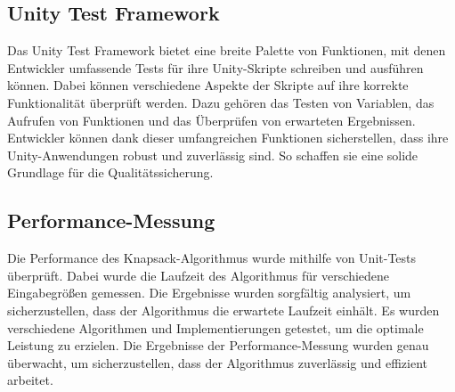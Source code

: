 \subsection{Unity Test Framework}
Das Unity Test Framework bietet eine breite Palette von Funktionen, mit denen Entwickler umfassende Tests für ihre
Unity-Skripte schreiben und ausführen können. Dabei können verschiedene Aspekte der Skripte auf ihre korrekte Funktionalität
überprüft werden. Dazu gehören das Testen von Variablen, das Aufrufen von Funktionen und das Überprüfen von erwarteten
Ergebnissen. Entwickler können dank dieser umfangreichen Funktionen sicherstellen, dass ihre Unity-Anwendungen robust
und zuverlässig sind. So schaffen sie eine solide Grundlage für die Qualitätssicherung.

\subsection{Performance-Messung}
Die Performance des Knapsack-Algorithmus wurde mithilfe von Unit-Tests überprüft. Dabei wurde die Laufzeit des Algorithmus
für verschiedene Eingabegrößen gemessen. Die Ergebnisse wurden sorgfältig analysiert, um sicherzustellen, dass der Algorithmus
die erwartete Laufzeit einhält. Es wurden verschiedene Algorithmen und Implementierungen getestet, um die optimale
Leistung zu erzielen. Die Ergebnisse der Performance-Messung wurden genau überwacht, um sicherzustellen, dass der
Algorithmus zuverlässig und effizient arbeitet.

